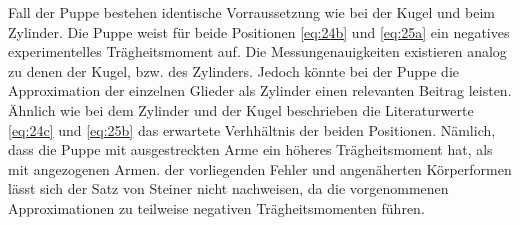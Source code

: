 \justifying Fall der Puppe bestehen identische Vorraussetzung wie bei der Kugel und beim Zylinder. Die Puppe weist für beide Positionen
\eqref{eq:24b} und \eqref{eq:25a} ein negatives experimentelles Trägheitsmoment auf. Die Messungenauigkeiten existieren analog zu denen der Kugel, 
bzw. des Zylinders. Jedoch könnte bei der Puppe die Approximation der einzelnen Glieder als Zylinder einen relevanten Beitrag leisten. 
Ähnlich wie bei dem Zylinder und der Kugel beschrieben die Literaturwerte \eqref{eq:24c} und \eqref{eq:25b} das erwartete Verhhältnis der beiden 
Positionen. Nämlich, dass die Puppe mit ausgestreckten Arme ein höheres Trägheitsmoment hat, als mit angezogenen Armen. 
\justifying der vorliegenden Fehler und angenäherten Körperformen lässt sich der Satz von Steiner nicht 
 nachweisen, da die vorgenommenen Approximationen zu teilweise negativen Trägheitsmomenten führen.

\newpage

\printbibliography
